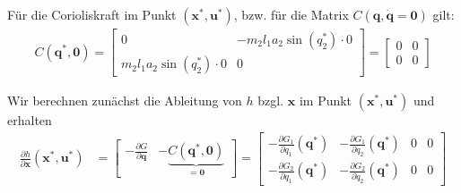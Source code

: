 \documentclass[a4paper, 12pt]{scrartcl}
\begin{document}
Für die Corioliskraft im Punkt $(\bm{x}^*,\bm{u}^*)$, 
bzw. für die Matrix $C(\bm{q}, \bm{\dot{q}}= \bm{0})$ gilt:
%
\begin{align*}
    C(\bm{q}^*, \bm{0}) 
    =
    \begin{bmatrix}
        0 & -m_2 l_1 a_2 \sin(q_2^*) \cdot 0 \\
        m_2 l_1 a_2 \sin(q_2^*) \cdot 0 & 0
    \end{bmatrix}
    =
    \begin{bmatrix}
        0 & 0 \\
        0 & 0
    \end{bmatrix}
\end{align*}

Wir berechnen zunächst die Ableitung von $h$ bzgl. $\bm{x}$ im Punkt $(\bm{x}^*, \bm{u}^*)$ 
und erhalten
\begin{align*}
    \frac{\partial h}{\partial \bm{x}}(\bm{x}^*, \bm{u}^*)
    &=
    \begin{bmatrix}
        - \frac{\partial G}{\partial \bm{q}} & - \underbrace{C(\bm{q}^*, \bm{0})}_{= \bm{0}}
    \end{bmatrix}
    =
    \begin{bmatrix}
        - \frac{\partial G_1}{\partial q_1}(\bm{q}^*) 
        & - \frac{\partial G_1}{\partial q_2}(\bm{q}^*) 
        & 0 & 0 \\
        - \frac{\partial G_2}{\partial q_1}(\bm{q}^*) 
        & - \frac{\partial G_2}{\partial q_2}(\bm{q}^*) 
        & 0 & 0
    \end{bmatrix}
\end{align*}
\end{document}
